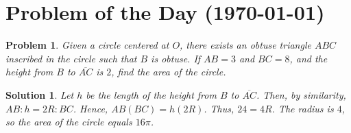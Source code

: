 \documentclass[12pt]{article}
\newtheorem*{problem}{Problem}
\newtheorem*{solution}{Solution}
\begin{document}
\section*{Problem of the Day (\today)}
\begin{problem}
Given a circle centered at $O$, there exists an obtuse triangle $ABC$ inscribed in the circle such that $B$ is obtuse. If $AB=3$ and $BC=8$, and the height from $B$ to $\overline{AC}$ is $2$, find the area of the circle.
\end{problem}

\begin{solution}
Let $h$ be the length of the height from $B$ to $\overline{AC}$. Then, by similarity, $AB:h=2R:BC$. Hence, $AB(BC)=h(2R)$. Thus, $24=4R$. The radius is $4$, so the area of the circle equals $16\pi$.
\end{solution}
\end{document}
